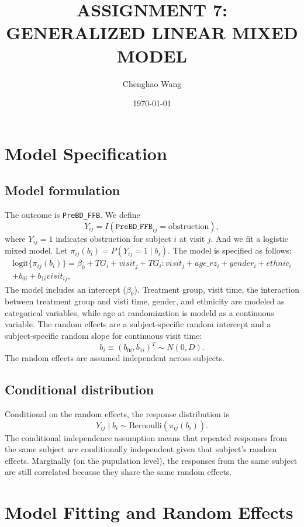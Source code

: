 \documentclass[12pt]{article}
\title{\Large\bfseries ASSIGNMENT 7: GENERALIZED LINEAR MIXED MODEL}
\author{Chenghao Wang}
\date{\today}
\begin{document}
\maketitle

\section{Model Specification}

\subsection{Model formulation}

The outcome is \texttt{PreBD\_FFB}. We define
\[
Y_{ij} = I(\texttt{PreBD\_FFB}_{ij} = \text{obstruction}),
\]
where $Y_{ij}=1$ indicates obstruction for subject $i$ at visit $j$.
And we fit a logistic mixed model.
Let $\pi_{ij}(b_i)=P(Y_{ij}=1 \mid b_i)$. The model is
specified as follows:
\begin{multline}
\mathrm{logit}\{\pi_{ij}(b_i)\}
= \beta_0 + TG_i + visit_j + TG_i:visit_j
 + age\_rz_i + gender_i + ethnic_i\\
 + b_{0i} + b_{1i}visit_{ij},
\end{multline}
The model includes
an intercept ($\beta_0$). Treatment group, visit time,
the interaction between treatment group and visti time,
gender, and ethnicity are modeled as categorical variables,
while age at randomization is modeld as a continuous variable.
The random effects are a subject-specific random intercept and a
subject-specific random slope for continuous visit time:
\[
b_i \equiv (b_{0i}, b_{1i})^T \sim N(0, D).
\]
The random effects are assumed independent across subjects.

\subsection{Conditional distribution}

Conditional on the random effects, the response distribution is
\[
Y_{ij} \mid b_i \sim \mathrm{Bernoulli}(\pi_{ij}(b_i)).
\]
The conditional independence assumption means that repeated responses from the
same subject are conditionally independent given that subject's random effects. 
Marginally (on the pupulation level), the responses from the same subject are
still correlated because they share the same random effects.

\section{Model Fitting and Random Effects}
\end{document}

